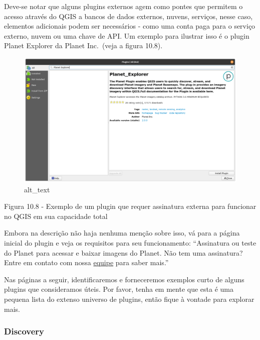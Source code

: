 \documentclass[
]{book}
\begin{document}
Deve-se notar que alguns plugins externos agem como pontes que permitem o acesso através do QGIS a bancos de dados externos, nuvens, serviços, nesse caso, elementos adicionais podem ser necessários - como uma conta paga para o serviço externo, nuvem ou uma chave de API. Um exemplo para ilustrar isso é o plugin Planet Explorer da Planet Inc.~(veja a figura 10.8).

\begin{figure}
\centering
\includegraphics{media/modulo10/fig108.png}
\caption{alt\_text}
\end{figure}

Figura 10.8 - Exemplo de um plugin que requer assinatura externa para funcionar no QGIS em sua capacidade total

Embora na descrição não haja nenhuma menção sobre isso, vá para a página inicial do plugin e veja os requisitos para seu funcionamento: ``Assinatura ou teste do Planet para acessar e baixar imagens do Planet. Não tem uma assinatura? Entre em contato com nossa \href{https://www.planet.com/contact/}{equipe} para saber mais.''

Nas páginas a seguir, identificaremos e forneceremos exemplos curto de alguns plugins que consideramos úteis. Por favor, tenha em mente que esta é uma pequena lista do extenso universo de plugins, então fique à vontade para explorar mais.

\hypertarget{discovery}{%
\subsubsection{\texorpdfstring{\textbf{Discovery}}{Discovery}}\label{discovery}}
\end{document}

